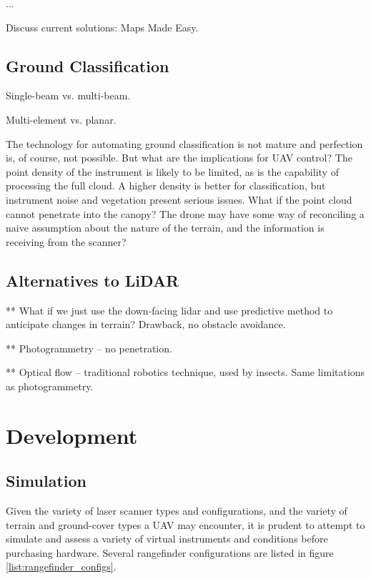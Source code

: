\documentclass[10pt,a4paper]{report}
\begin{document}
...

Discuss current solutions: Maps Made Easy.



\subsection{Ground Classification}

Single-beam vs. multi-beam.

Multi-element vs. planar. \cite{Nobili2015}

The technology for automating ground classification is not mature \cite{Vosselman2001,Vosselman2000} and perfection is, of course, not possible. But what are the implications for UAV control? The point density of the instrument is likely to be limited, as is the capability of processing the full cloud. A higher density is better for classification, but instrument noise and vegetation present serious issues. What if the point cloud cannot penetrate into the canopy? The drone may have some way of reconciling a naive assumption about the nature of the terrain, and the information is receiving from the scanner?


\subsection{Alternatives to LiDAR}

** What if we just use the down-facing lidar and use predictive method to anticipate changes in terrain? Drawback, no obstacle avoidance.

** Photogrammetry -- no penetration.

** Optical flow -- traditional robotics technique, used by insects. Same limitations as photogrammetry.


\section{Development}


\subsection{Simulation}

Given the variety of laser scanner types and configurations, and the variety of terrain and ground-cover types a UAV may encounter, it is prudent to attempt to simulate and assess a variety of virtual instruments and conditions before purchasing hardware. Several rangefinder configurations are listed in figure \ref{list:rangefinder_configs}.
\end{document}
